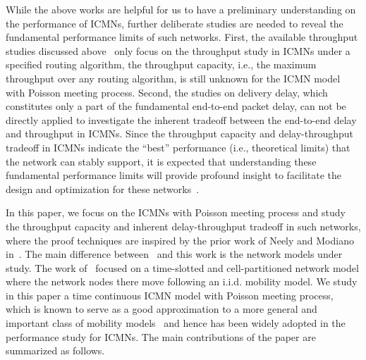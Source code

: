 \documentclass[twocolumn, 10pt]{svjour3}         \smartqed  \usepackage{graphicx}
\begin{document}
While the above works are helpful for us to have a preliminary understanding on the performance of ICMNs, further deliberate studies are needed to reveal the fundamental performance limits of such networks. 
First, the available throughput studies discussed above~\cite{Subramanian2009Proc.IEEEISIT,Subramanian2009Proc.IEEEWiOPT,Subramanian2012Proc.IEEEICC} only focus on the  throughput study in ICMNs under a specified routing algorithm, the  throughput capacity, i.e., the maximum  throughput over any routing algorithm, is still unknown for the ICMN model with Poisson meeting process.
Second, the studies on delivery delay, which constitutes only a part of the fundamental end-to-end packet delay, can not be directly applied to investigate the inherent tradeoff between the end-to-end delay and  throughput in ICMNs.
Since the throughput capacity and  delay-throughput tradeoff in ICMNs indicate the ``best'' performance (i.e., theoretical  limits) that the network can stably support, it is expected that understanding these fundamental performance limits will provide profound insight to facilitate the design and optimization for these networks~\cite{Goldsmith2011}. 



In this paper, we focus on the ICMNs with Poisson meeting process and study the throughput capacity and inherent delay-throughput tradeoff in such networks, where the proof techniques are inspired by the prior work of Neely and Modiano in~\cite{Neely2005}. 
The main difference between~\cite{Neely2005} and this work is the  network models under study.
The work of~\cite{Neely2005} focused on a time-slotted and cell-partitioned network model where the network nodes there move following an i.i.d. mobility model.
We study in this paper a time continuous ICMN model with Poisson meeting process, which is known to serve as a good approximation to a more general and important class of mobility models~\cite{Groenevelt2005, Groenevelt2005a} and hence has been widely adopted in the performance study for ICMNs.
The main contributions of the paper are summarized as follows.
\end{document}
